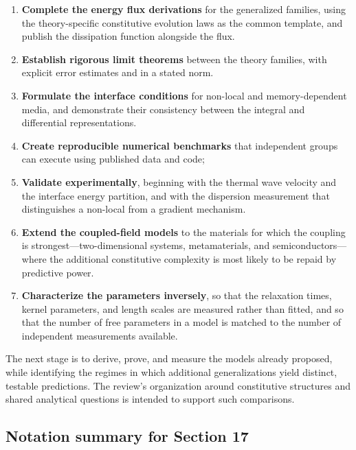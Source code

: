 \begin{enumerate}
\item \textbf{Complete the energy flux derivations} for the generalized families, using the theory-specific constitutive evolution laws as the common template, and publish the dissipation function alongside the flux.
\item \textbf{Establish rigorous limit theorems} between the theory families, with explicit error estimates and in a stated norm.
\item \textbf{Formulate the interface conditions} for non-local and memory-dependent media, and demonstrate their consistency between the integral and differential representations.
\item \textbf{Create reproducible numerical benchmarks} that independent groups can execute using published data and code;
\item \textbf{Validate experimentally}, beginning with the thermal wave velocity and the interface energy partition, and with the dispersion measurement that distinguishes a non-local from a gradient mechanism.
\item \textbf{Extend the coupled-field models} to the materials for which the coupling is strongest---two-dimensional systems, metamaterials, and semiconductors---where the additional constitutive complexity is most likely to be repaid by predictive power.
\item \textbf{Characterize the parameters inversely}, so that the relaxation times, kernel parameters, and length scales are measured rather than fitted, and so that the number of free parameters in a model is matched to the number of independent measurements available.
\end{enumerate}
The next stage is to derive, prove, and measure the models already proposed, while identifying the regimes in which additional generalizations yield distinct, testable predictions. The review's organization around constitutive structures and shared analytical questions is intended to support such comparisons.

\subsection{Notation summary for Section 17}

